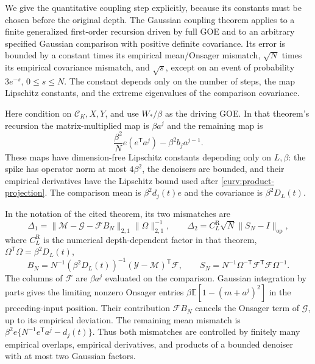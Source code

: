 \documentclass[11pt,reqno]{amsart}
\begin{document}
We give the quantitative coupling step explicitly, because its constants
must be chosen before the original depth. The Gaussian coupling theorem
\cite[Theorem 4]{reeves2025dimension} applies to a finite generalized first-order
recursion driven by full GOE and to an arbitrary specified Gaussian
comparison with positive definite covariance. Its error is bounded by a
constant times its empirical mean/Onsager mismatch, $\sqrt N$ times its
empirical covariance mismatch, and $\sqrt s$, except on an event of
probability $3e^{-s}$, $0\le s\le N$. The constant depends only on the
number of steps, the map Lipschitz constants, and the extreme eigenvalues
of the comparison covariance.

Here condition on $\mathcal C_K,X,Y$, and use $W_*/\beta$ as the driving
GOE. In that theorem's recursion the matrix-multiplied map is $\beta a^j$
and the remaining map is
\[
        \frac{\beta^2}{N}e(e^{\mathsf T}a^j)
                        -\beta^2b_j a^{j-1}.
\]
These maps have dimension-free Lipschitz constants depending only on
$L,\beta$: the spike has operator norm at most $4\beta^2$, the denoisers
are bounded, and their empirical derivatives have the Lipschitz bound
used after \eqref{curv:product-projection}. The comparison mean is
$\beta^2d_j(t)e$ and the covariance is $\beta^2D_L(t)$.

In the notation of the cited theorem, its two mismatches are
\[
 \Delta_1=\|\mathcal M-\mathcal G-\mathcal F B_N\|_{2,1}
                      \|\Omega\|_{2,1}^{-1},\qquad
 \Delta_2=C_L^{\mathrm R}\sqrt N\|S_N-I\|_{\mathrm{op}},
\]
where $C_L^{\mathrm R}$ is the numerical depth-dependent factor in that
theorem, $\Omega^{\mathsf T}\Omega=\beta^2D_L(t)$,
\[
 B_N=N^{-1}(\beta^2D_L(t))^{-1}
                (\mathcal Y-\mathcal M)^{\mathsf T}\mathcal F,
 \qquad
 S_N=N^{-1}\Omega^{-\mathsf T}\mathcal F^{\mathsf T}
                                           \mathcal F\Omega^{-1}.
\]
The columns of $\mathcal F$ are $\beta a^j$ evaluated on the comparison.
Gaussian integration by parts gives the limiting nonzero Onsager entries
$\beta\mathbb E[1-(m+a^j)^2]$ in the preceding-input position. Their
contribution $\mathcal F B_N$ cancels the Onsager term of
$\mathcal G$, up to its empirical deviation. The remaining mean mismatch
is $\beta^2e\{N^{-1}e^{\mathsf T}a^j-d_j(t)\}$.
Thus both mismatches are controlled by finitely many empirical overlaps,
empirical derivatives, and products of a bounded denoiser with at most
two Gaussian factors.
\end{document}
